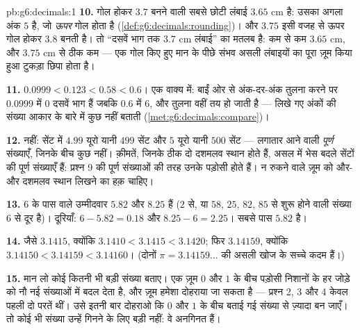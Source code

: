 \begin{solution}{pb:g6:decimals:1}
\textbf{10.} गोल होकर $3.7$ बनने वाली सबसे छोटी लंबाई $3.65$ cm
है: उसका अगला अंक $5$ है, जो \emph{ऊपर} गोल होता है
(\cref{def:g6:decimals:rounding})। और $3.75$ इसी वजह से ऊपर
गोल होकर $3.8$ बनती है। तो ``दसवें भाग तक $3.7$ cm लंबाई'' का मतलब है:
कम से कम $3.65$ cm, और $3.75$ cm से ठीक कम --- एक गोल किए हुए
मान के पीछे संभव असली लंबाइयों का पूरा ज़ूम किया हुआ टुकड़ा छिपा
होता है।

\textbf{11.} $0.0999 < 0.123 < 0.58 < 0.6$। एक वाक्य में:
बाईं ओर से अंक-दर-अंक तुलना करने पर $0.0999$ में $0$ दसवें भाग
हैं जबकि $0.6$ में $6$, और तुलना वहीं तय हो जाती है --- लिखे गए
अंकों की संख्या आकार के बारे में कुछ नहीं बताती
(\cref{met:g6:decimals:compare})।

\textbf{12.} नहीं: सेंट में $4.99$ यूरो यानी $499$ सेंट और $5$
यूरो यानी $500$ सेंट --- लगातार आने वाली \emph{पूर्ण} संख्याएँ,
जिनके बीच कुछ नहीं। क़ीमतें, जिनके ठीक दो दशमलव स्थान होते हैं,
असल में भेस बदले सेंटों की पूर्ण संख्याएँ हैं: प्रश्न 9 की
पूर्ण संख्याओं की तरह उनके पड़ोसी होते हैं। न रुकने वाले ज़ूम को
और-और दशमलव स्थान लिखने का हक़ चाहिए।

\textbf{13.} $6$ के पास वाले उम्मीदवार $5.82$ और $8.25$ हैं ($2$
से, या $58$, $25$, $82$, $85$ से शुरू होने वाली संख्या $6$ से
दूर है)। दूरियाँ: $6 - 5.82 = 0.18$ और $8.25 - 6 = 2.25$।
सबसे पास $5.82$ है।

\textbf{14.} जैसे $3.1415$, क्योंकि
$3.1410 < 3.1415 < 3.1420$; फिर $3.14159$, क्योंकि
$3.14150 < 3.14159 < 3.14160$। (दोनों $\pi = 3.14159\dots$ की
असली खोज के सच्चे कदम हैं।)

\textbf{15.} मान लो कोई कितनी भी बड़ी संख्या बताए। एक ज़ूम $0$
और $1$ के बीच पड़ोसी निशानों के हर जोड़े को नौ नई संख्याओं में
बदल देता है, और ज़ूम हमेशा दोहराया जा सकता है --- प्रश्न 2, 3
और 4 केवल पहली दो परतें थीं। उसे इतनी बार दोहराओ कि $0$ और $1$
के बीच बताई गई संख्या से ज़्यादा  बन जाएँ। तो कोई
भी संख्या उन्हें गिनने के लिए बड़ी नहीं: वे अनगिनत हैं।

\end{solution}
